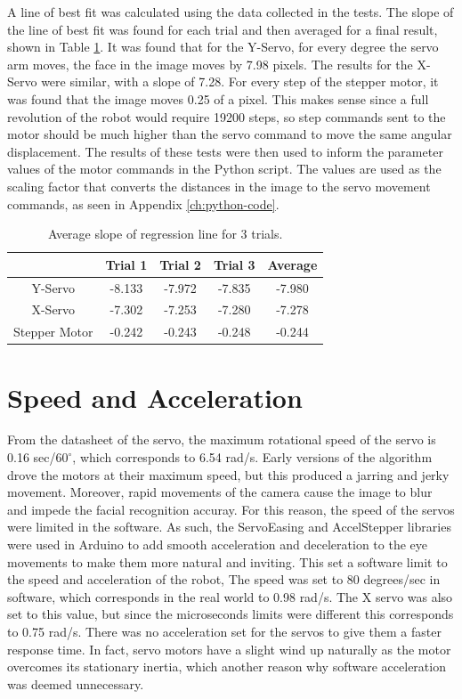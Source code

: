 A line of best fit was calculated using the data collected in the tests. The slope of the line of best fit was found for each trial and then averaged for a final result, shown in Table \ref{tbl:averages}. It was found that for the Y-Servo, for every degree the servo arm moves, the face in the image moves by 7.98 pixels. The results for the X-Servo were similar, with a slope of 7.28. For every step of the stepper motor, it was found that the image moves 0.25 of a pixel. This makes sense since a full revolution of the robot would require 19200 steps, so step commands sent to the motor should be much higher than the servo command to move the same angular displacement. The results of these tests were then used to inform the parameter values of the motor commands in the Python script. The values are used as the scaling factor that converts the distances in the image to the servo movement commands, as seen in Appendix \ref{ch:python-code}. 

\begin{table}[h]
    \centering
    \caption{Average slope of regression line for 3 trials.}
    \label{tbl:averages}

    \begin{tabular}{c|c|c|c|c}
         & Trial 1 & Trial 2 & Trial 3 & Average\\
        \hline
        Y-Servo & -8.133 & -7.972 & -7.835 & -7.980\\
        X-Servo & -7.302 & -7.253 & -7.280 & -7.278\\
        Stepper Motor & -0.242 & -0.243 & -0.248 & -0.244\\
    \end{tabular}
\end{table}

\section{Speed and Acceleration}
From the datasheet of the servo, the maximum rotational speed of the servo is 0.16 sec/$60^\circ$, which corresponds to 6.54 rad/s. Early versions of the algorithm drove the motors at their maximum speed, but this produced a jarring and jerky movement. Moreover, rapid movements of the camera cause the image to blur and impede the facial recognition accuray. For this reason, the speed of the servos were limited in the software. As such, the ServoEasing and AccelStepper libraries were used in Arduino to add smooth acceleration and deceleration to the eye movements to make them more natural and inviting. This set a software limit to the speed and acceleration of the robot, The speed was set to 80 degrees/sec in software, which corresponds in the real world to 0.98 rad/s. The X servo was also set to this value, but since the microseconds limits were different this corresponds to 0.75 rad/s. There was no acceleration set for the servos to give them a faster response time. In fact, servo motors have a slight wind up naturally as the motor overcomes its stationary inertia, which another reason why software acceleration was deemed unnecessary.

